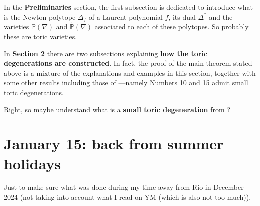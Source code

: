 In the \textbf{Preliminaries} section, the first subsection is dedicated to introduce what is the Newton polytope \(\Delta_f\) of a Laurent polynomial $f$, its dual \(\Delta^*\) and the varieties \(\mathbb{P}(\nabla)\) and \(\tilde{\mathbb{P}}(\nabla)\) associated to each of these polytopes. {\color{6}So probably these are toric varieties.}

In \textbf{Section 2}  there are two subsections explaining \textbf{how the toric degenerations are constructed}. In fact, the proof of the main theorem stated above is a mixture of the explanations and examples in this section, together with some other results including those of  \cite{galkin1}---namely Numbers 10 and 15 admit small toric degenerations.

Right, so maybe understand what is a \textbf{small toric degeneration} from \cite{galkin1}?

\section{January 15: back from summer holidays}

Just to make sure what was done during my time away from Rio in December 2024 (not taking into account what I read on YM (which is also not too much)).

